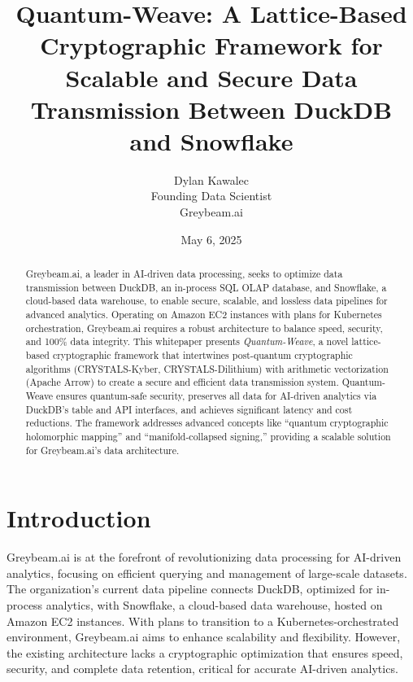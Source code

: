 \documentclass[12pt]{article}
\begin{document}
\title{Quantum-Weave: A Lattice-Based Cryptographic Framework for Scalable and Secure Data Transmission Between DuckDB and Snowflake}
\author{Dylan Kawalec \\ Founding Data Scientist \\ Greybeam.ai}
\date{May 6, 2025}
\maketitle

\begin{abstract}
Greybeam.ai, a leader in AI-driven data processing, seeks to optimize data transmission between DuckDB, an in-process SQL OLAP database, and Snowflake, a cloud-based data warehouse, to enable secure, scalable, and lossless data pipelines for advanced analytics. Operating on Amazon EC2 instances with plans for Kubernetes orchestration, Greybeam.ai requires a robust architecture to balance speed, security, and 100\% data integrity. This whitepaper presents \textit{Quantum-Weave}, a novel lattice-based cryptographic framework that intertwines post-quantum cryptographic algorithms (CRYSTALS-Kyber, CRYSTALS-Dilithium) with arithmetic vectorization (Apache Arrow) to create a secure and efficient data transmission system. Quantum-Weave ensures quantum-safe security, preserves all data for AI-driven analytics via DuckDB’s table and API interfaces, and achieves significant latency and cost reductions. The framework addresses advanced concepts like ``quantum cryptographic holomorphic mapping'' and ``manifold-collapsed signing,'' providing a scalable solution for Greybeam.ai’s data architecture.
\end{abstract}

\section{Introduction}
Greybeam.ai is at the forefront of revolutionizing data processing for AI-driven analytics, focusing on efficient querying and management of large-scale datasets. The organization’s current data pipeline connects DuckDB, optimized for in-process analytics, with Snowflake, a cloud-based data warehouse, hosted on Amazon EC2 instances. With plans to transition to a Kubernetes-orchestrated environment, Greybeam.ai aims to enhance scalability and flexibility. However, the existing architecture lacks a cryptographic optimization that ensures speed, security, and complete data retention, critical for accurate AI-driven analytics.
\end{document}
